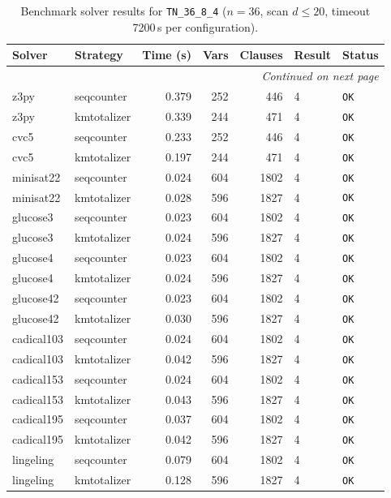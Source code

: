 \begin{longtable}{llrrrl p{}}
\caption{Benchmark solver results for \texttt{TN\_36\_8\_4} ($n=36$, scan $d \leq 20$, timeout 7200\,s per configuration).} \label{tab:bench-TN_36_8_4} \\
\toprule
Solver & Strategy & Time (s) & Vars & Clauses & Result & Status \\
\midrule
\endhead
\midrule
\multicolumn{7}{r}{\textit{Continued on next page}} \\
\midrule
\endfoot
\bottomrule
\endlastfoot
z3py & seqcounter & 0.379 & 252 & 446 & 4 & \texttt{OK} \\
z3py & kmtotalizer & 0.339 & 244 & 471 & 4 & \texttt{OK} \\
cvc5 & seqcounter & 0.233 & 252 & 446 & 4 & \texttt{OK} \\
cvc5 & kmtotalizer & 0.197 & 244 & 471 & 4 & \texttt{OK} \\
minisat22 & seqcounter & 0.024 & 604 & 1802 & 4 & \texttt{OK} \\
minisat22 & kmtotalizer & 0.028 & 596 & 1827 & 4 & \texttt{OK} \\
glucose3 & seqcounter & 0.023 & 604 & 1802 & 4 & \texttt{OK} \\
glucose3 & kmtotalizer & 0.024 & 596 & 1827 & 4 & \texttt{OK} \\
glucose4 & seqcounter & 0.023 & 604 & 1802 & 4 & \texttt{OK} \\
glucose4 & kmtotalizer & 0.024 & 596 & 1827 & 4 & \texttt{OK} \\
glucose42 & seqcounter & 0.023 & 604 & 1802 & 4 & \texttt{OK} \\
glucose42 & kmtotalizer & 0.030 & 596 & 1827 & 4 & \texttt{OK} \\
cadical103 & seqcounter & 0.024 & 604 & 1802 & 4 & \texttt{OK} \\
cadical103 & kmtotalizer & 0.042 & 596 & 1827 & 4 & \texttt{OK} \\
cadical153 & seqcounter & 0.024 & 604 & 1802 & 4 & \texttt{OK} \\
cadical153 & kmtotalizer & 0.043 & 596 & 1827 & 4 & \texttt{OK} \\
cadical195 & seqcounter & 0.037 & 604 & 1802 & 4 & \texttt{OK} \\
cadical195 & kmtotalizer & 0.042 & 596 & 1827 & 4 & \texttt{OK} \\
lingeling & seqcounter & 0.079 & 604 & 1802 & 4 & \texttt{OK} \\
lingeling & kmtotalizer & 0.128 & 596 & 1827 & 4 & \texttt{OK} \\

\end{longtable}
